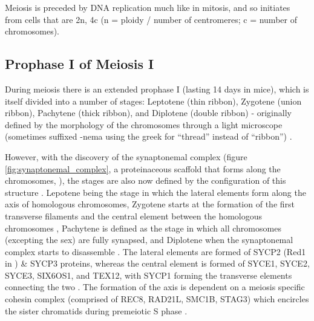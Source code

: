 Meiosis is preceded by DNA replication much like in mitosis, and so initiates from cells that are 2n, 4c (n = ploidy / number of centromeres; c = number of chromosomes).

\subsection{Prophase I of Meiosis I}
During meiosis there is an extended prophase I (lasting 14 days in mice), which is itself divided into a number of stages: Leptotene (thin ribbon), Zygotene (union ribbon), Pachytene (thick ribbon), and Diplotene (double ribbon) - originally defined by the morphology of the chromosomes through a light microscope (sometimes suffixed -nema using the greek for ``thread'' instead of ``ribbon'') \parencite{DeWiniwarter1900Recherches, Gregoire1907formation, Wilson1912Studies, Zickler1998leptotenezygotene}.

However, with the discovery of the synaptonemal complex (figure \ref{fig:synaptonemal_complex}, a proteinaceous scaffold that forms along the chromosomes, \cite{Moses1956Chromosomal, Fawcett1956FINE}), the stages are also now defined by the configuration of this structure \parencite{Zickler2015Recombination}.
Lepotene being the stage in which the lateral elements form along the axis of homologous chromosomes, Zygotene starts at the formation of the first transverse filaments and the central element between the homologous chromosomes \parencite{Moens1968structure}, Pachytene is defined as the stage in which all chromosomes (excepting the sex) are fully synapsed, and Diplotene when the synaptonemal complex starts to disassemble \parencite{Moses1958Relation, Moses1977Synaptonemal}.
The lateral elements are formed of SYCP2 (Red1 in ) & SYCP3 proteins, whereas the central element is formed of SYCE1, SYCE2, SYCE3, SIX6OS1, and TEX12, with SYCP1 forming the transverse elements connecting the two \parencite[reviewed in][]{Zickler2015Recombination, Gao2018Zipping, Kaniecki2018change, Dunce2018Structural}.
The formation of the axis is dependent on a meiosis specific cohesin complex (comprised of REC8, RAD21L, SMC1B, STAG3) which encircles the sister chromatids during premeiotic S phase \parencite[reviewed in][]{Rankin2015Complex, Ishiguro2019cohesin}.

